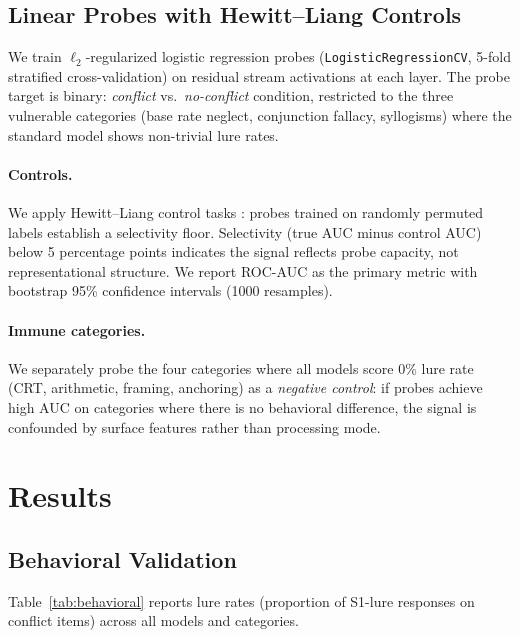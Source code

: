 \documentclass[accepted]{article}
\begin{document}
\subsection{Linear Probes with Hewitt--Liang Controls}
\label{sec:probes}

We train $\ell_2$-regularized logistic regression probes
(\texttt{LogisticRegressionCV}, 5-fold stratified cross-validation) on
residual stream activations at each layer.  The probe target is binary:
\emph{conflict} vs.\ \emph{no-conflict} condition, restricted to the three
vulnerable categories (base rate neglect, conjunction fallacy, syllogisms)
where the standard model shows non-trivial lure rates.

\paragraph{Controls.}  We apply Hewitt--Liang control tasks
\citep{hewitt2019control}: probes trained on randomly permuted labels
establish a selectivity floor.  Selectivity (true AUC minus control AUC)
below 5 percentage points indicates the signal reflects probe capacity,
not representational structure.  We report ROC-AUC as the primary metric
with bootstrap 95\% confidence intervals (1000 resamples).

\paragraph{Immune categories.}  We separately probe the four categories
where all models score 0\% lure rate (CRT, arithmetic, framing,
anchoring) as a \emph{negative control}: if probes achieve high AUC on
categories where there is no behavioral difference, the signal is
confounded by surface features rather than processing mode.


\section{Results}
\label{sec:results}

\subsection{Behavioral Validation}
\label{sec:results_behavioral}

Table~\ref{tab:behavioral} reports lure rates (proportion of S1-lure
responses on conflict items) across all models and categories.
\end{document}
